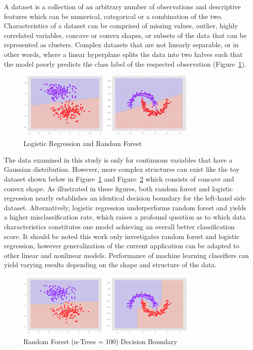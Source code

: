 \documentclass{llncs}
\begin{document}
A dataset is a collection of an arbitrary number of observations and descriptive features which can be numerical, categorical or a combination of the two. Characteristics of a dataset can be comprised of missing values, outlier, highly correlated variables, concave or convex shapes, or subsets of the data that can be represented as clusters. Complex datasets that are not linearly separable, or in other words, where a linear hyperplane splits the data into two halves such that the model poorly predicts the class label of the respected observation (Figure~\ref{fig:boundary1}). 


\begin{figure}
\centering
\includegraphics[width=0.8\textwidth]{decisionboundary.png}
\caption{Logistic Regression and Random Forest}
\label{fig:boundary1}
\end{figure}


The data examined in this study is only for continuous variables that have a Gaussian distribution. However, more complex structures can exist like the toy dataset shown below in Figure~\ref{fig:boundary1} and Figure~\ref{fig:boundary2} which consists of concave and convex shape. As illustrated in these figures, both random forest and logistic regression nearly establishes an identical decision boundary for the left-hand side dataset. Alternatively, logistic regression underperforms random forest and yields a higher misclassification rate, which raises a profound question as to which data characteristics constitutes one model achieving an overall better classification score. It should be noted this work only investigates random forest and logistic regression, however generalization of the current application can be adapted to other linear and nonlinear models. Performance of machine learning classifiers can yield varying results depending on the shape and structure of the data.


\begin{figure}
\centering
\includegraphics[width=0.8\textwidth]{decisionboundary2.png}
\caption{Random Forest (n-Trees = 100) Decision Boundary}
\label{fig:boundary2}
\end{figure}
\end{document}
